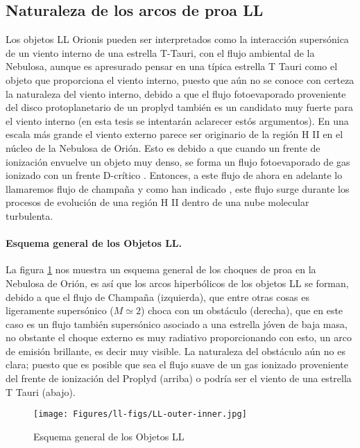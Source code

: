 \subsection{Naturaleza de los arcos de proa LL }
\label{sec:choques}

Los objetos LL Orionis pueden ser interpretados como la interacción supersónica de un viento interno de una estrella T-Tauri, con el flujo ambiental de la Nebulosa, aunque es apresurado pensar en una típica estrella T Tauri como el objeto que proporciona el viento interno, puesto que aún no se conoce con certeza la naturaleza del viento interno, debido a que el flujo fotoevaporado proveniente del disco protoplanetario de un proplyd también es un candidato muy fuerte para el viento interno (en esta tesis se intentarán aclarecer estós argumentos). En una escala más grande el viento externo parece ser originario de la  región H II en el núcleo de la Nebulosa de Orión. Esto es debido a que cuando un frente de ionización envuelve un objeto muy denso, se forma un flujo fotoevaporado de gas ionizado con un frente D-crítico \citep{Dyson:1968}. Entonces, a este flujo de ahora en adelante lo llamaremos flujo de champaña y como han indicado \citet{Mellema:2006, Arthur:2011, Ercolano:2012}, este flujo surge durante los procesos de evolución de una región H II dentro de una nube molecular turbulenta.\\

\paragraph{Esquema general de los Objetos LL.} La figura \ref{fig:esquema-arcos} nos muestra un esquema general de los choques de proa en la Nebulosa de Orión, es así que los arcos hiperbólicos de los objetos LL se forman, debido a que el flujo de Champaña (izquierda), que entre otras cosas es ligeramente supersónico (\(M\simeq2\)) choca con un obstáculo (derecha), que en este caso es un flujo también supersónico asociado a una estrella jóven de baja masa, no obstante el choque externo es muy radiativo proporcionando con esto, un arco de emisión brillante, es decir muy visible. La naturaleza del obstáculo aún no es clara; puesto que  es posible que sea el flujo suave de un gas ionizado proveniente del frente de ionización del Proplyd (arriba) o podría ser el viento de una estrella T Tauri (abajo).\\ 

\begin{figure}
  \centering
  \texttt{[image: Figures/ll-figs/LL-outer-inner.jpg]}
  \caption{Esquema general de los Objetos LL}
  \label{fig:esquema-arcos}
\end{figure}

